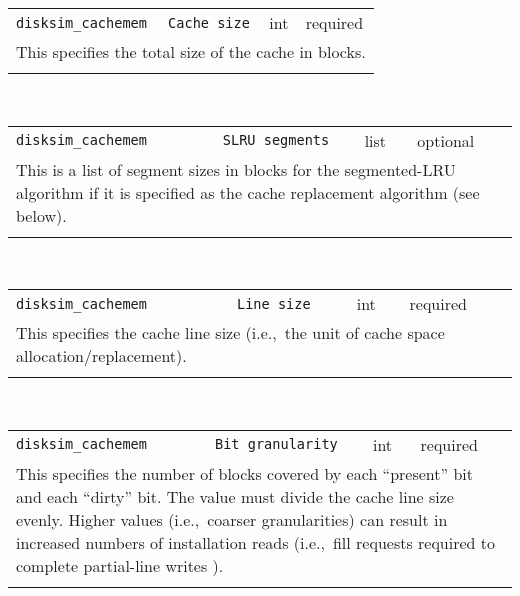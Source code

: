 \noindent 
\begin{tabular}{|p{\lpmodwidth}|p{\lpnamewidth}|p{0.5in}|p{0.5in}|}
\cline{1-4}
\texttt{disksim\_cachemem} & \texttt{Cache size} & int & required \\ 
\cline{1-4}
\multicolumn{4}{|p{6in}|}{
This specifies the total size of the cache in blocks.
}\\ 
\cline{1-4}
\multicolumn{4}{p{5in}}{}\\
\end{tabular}\\ 
\noindent 
\begin{tabular}{|p{\lpmodwidth}|p{\lpnamewidth}|p{0.5in}|p{0.5in}|}
\cline{1-4}
\texttt{disksim\_cachemem} & \texttt{SLRU segments} & list & optional \\ 
\cline{1-4}
\multicolumn{4}{|p{6in}|}{
This is a list of segment sizes in blocks for the segmented-LRU algorithm
\cite{Karedla94} if it is specified as the cache replacement algorithm
(see below).
}\\ 
\cline{1-4}
\multicolumn{4}{p{5in}}{}\\
\end{tabular}\\ 
\noindent 
\begin{tabular}{|p{\lpmodwidth}|p{\lpnamewidth}|p{0.5in}|p{0.5in}|}
\cline{1-4}
\texttt{disksim\_cachemem} & \texttt{Line size} & int & required \\ 
\cline{1-4}
\multicolumn{4}{|p{6in}|}{
This specifies the cache line size (i.e.,~the unit of cache space
allocation/replacement).
}\\ 
\cline{1-4}
\multicolumn{4}{p{5in}}{}\\
\end{tabular}\\ 
\noindent 
\begin{tabular}{|p{\lpmodwidth}|p{\lpnamewidth}|p{0.5in}|p{0.5in}|}
\cline{1-4}
\texttt{disksim\_cachemem} & \texttt{Bit granularity} & int & required \\ 
\cline{1-4}
\multicolumn{4}{|p{6in}|}{
This specifies the number of blocks covered by each ``present'' bit and
each ``dirty'' bit. The value must divide the cache line size evenly.
Higher values (i.e.,~coarser granularities) can result in increased
numbers of installation reads (i.e.,~fill requests required to
complete partial-line writes \cite{Otoole94}).
}\\ 
\cline{1-4}
\multicolumn{4}{p{5in}}{}\\
\end{tabular}\\ 
